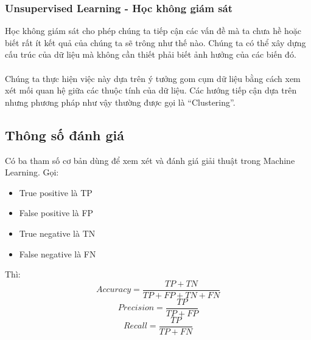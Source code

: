 \subsubsection{Unsupervised Learning - Học không giám sát}
Học không giám sát cho phép chúng ta tiếp cận các vấn đề mà ta chưa hề hoặc biết
rất ít kết quả của chúng ta sẽ trông như thế nào. Chúng ta có thể xây dựng cấu
trúc của dữ liệu mà không cần thiết phải biết ảnh hưởng của các biến đó.\\\\
Chúng ta thực hiện việc này dựa trên ý tưởng gom cụm dữ liệu bằng cách xem xét
mối quan hệ giữa các thuộc tính của dữ liệu. Các hướng tiếp cận dựa trên nhưng 
phương pháp như vậy thường được gọi là “Clustering”.

\subsection{Thông số đánh giá}
Có ba tham số cơ bản dùng để xem xét và đánh giá giải thuật trong Machine Learning.
Gọi:
\begin{itemize}
\item True positive là TP
\item False positive là FP
\item True negative là TN
\item False negative là FN
\end{itemize}
Thì:\\
\[
  Accuracy = \frac{TP+TN}{TP+FP+TN+FN}
\]
\[
  Precision = \frac{TP}{TP+FP}
\]
\[
  Recall = \frac{TP}{TP+FN}
\]\\
